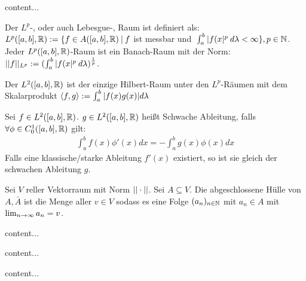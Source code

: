 \begin{definition}
	content...
\end{definition}

\begin{definition}[$L^p$ - Raum]
	Der $L^p$-, oder auch Lebesgue-, Raum ist definiert als: $L^p([a,b], \mathbb{R}) := \{ f \in A([a,b],\mathbb{R}) \medspace | \medspace f $ ist messbar und $ \medspace \int_a^b |f(x|^p \medspace d\lambda < \infty \}, p \in \mathbb{N}$. Jeder $L^p([a,b],\mathbb{R})$-Raum ist ein Banach-Raum mit der Norm: $||f||_{L^p} := (\int_{a}^{b} |f(x|^p \medspace d \lambda )^\frac{1}{p}$.
\end{definition}

\begin{satz}
	Der $L^2([a,b],\mathbb{R})$ ist der einzige Hilbert-Raum unter den $L^p$-Räumen mit dem Skalarprodukt $\langle f, g \rangle := \int_{a}^{b} |f(x)g(x)| d\lambda$
\end{satz}

\begin{definition}
	Sei $f \in L^2([a,b],\mathbb{R})$. $g \in L^2([a,b],\mathbb{R})$ heißt Schwache Ableitung, falls $\forall \phi \in C_0^1([a,b],\mathbb{R})$ gilt:
	\begin{align*}
		\int_{a}^{b} f(x) \phi'(x) dx = - \int_{a}^{b} g(x) \phi(x) dx
	\end{align*}
	Falls eine klassische/starke Ableitung $f'(x)$ existiert, so ist sie gleich der schwachen Ableitung $g$. 
\end{definition}

\begin{definition}
	Sei $V$ reller Vektorraum mit Norm $|| \cdot ||$. Sei $A \subseteq V$. Die abgeschlossene Hülle von $A, \bar{A}$ ist die Menge aller $v \in V$ sodass es eine Folge $(a_{n})_{n \in \mathbb{N}}$ mit $a_n \in A $ mit $\lim_{n \rightarrow \infty} a_n = v$.
\end{definition}

\begin{satz}
	content...
\end{satz}

\begin{definition}
	content...
\end{definition}


\begin{definition}
	content...
\end{definition}


